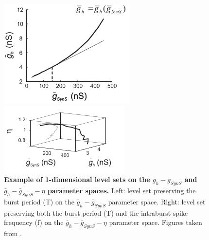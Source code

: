 \begin{figure}[h]
\centering
\begin{minipage}{0.35\linewidth}
  \begin{center}
\includegraphics[width=1\linewidth]{Images/photo4_1.png}
\end{center}
  \end{minipage} 
  \begin{minipage}{0.4\linewidth}
  \begin{center}
\includegraphics[width=1\linewidth]{Images/photo4_2.png}
\end{center}
  \end{minipage} 
  \caption{\textbf{Example of 1-dimensional level sets on the $\bar{g}_{h}-\bar{g}_{SynS}$  and $\bar{g}_{h}-\bar{g}_{SynS}-\eta$ parameter spaces.} Left: level set preserving the burst period (T) on the $\bar{g}_{h}-\bar{g}_{SynS}$ parameter space. Right: level set preserving both the burst period (T) and the intraburst spike frequency (f) on the $\bar{g}_{h}-\bar{g}_{SynS}-\eta$ parameter space. Figures taken from \cite{Oly}.}
  \label{photo4}
\end{figure}

